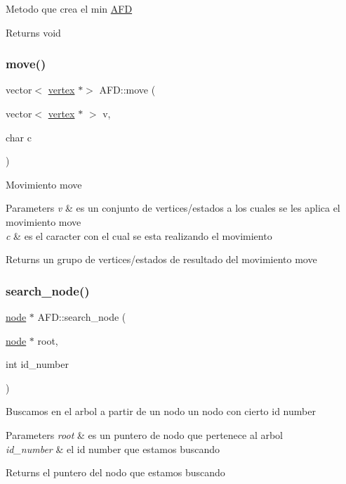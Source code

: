 Metodo que crea el min \hyperlink{class_a_f_d}{A\+FD} \begin{DoxyReturn}{Returns}
void 
\end{DoxyReturn}
\hypertarget{class_a_f_d_a4505bb76534ae8c4df01c164912f5c52}{}\label{class_a_f_d_a4505bb76534ae8c4df01c164912f5c52} 
\subsubsection{\texorpdfstring{move()}{move()}}
{\footnotesize\ttfamily vector$<$ \hyperlink{structvertex}{vertex} $\ast$$>$ A\+F\+D\+::move (\begin{DoxyParamCaption}\item[{vector$<$ \hyperlink{structvertex}{vertex} $\ast$ $>$}]{v,  }\item[{char}]{c }\end{DoxyParamCaption})}

Movimiento move 
\begin{DoxyParams}{Parameters}
{\em v} & es un conjunto de vertices/estados a los cuales se les aplica el movimiento move \\
\hline
{\em c} & es el caracter con el cual se esta realizando el movimiento \\
\hline
\end{DoxyParams}
\begin{DoxyReturn}{Returns}
un grupo de vertices/estados de resultado del movimiento move 
\end{DoxyReturn}
\hypertarget{class_a_f_d_a4dfefc5091e8654160f65db0bc4fc0b0}{}\label{class_a_f_d_a4dfefc5091e8654160f65db0bc4fc0b0} 
\subsubsection{\texorpdfstring{search\+\_\+node()}{search\_node()}}
{\footnotesize\ttfamily \hyperlink{structnode}{node} $\ast$ A\+F\+D\+::search\+\_\+node (\begin{DoxyParamCaption}\item[{\hyperlink{structnode}{node} $\ast$}]{root,  }\item[{int}]{id\+\_\+number }\end{DoxyParamCaption})}

Buscamos en el arbol a partir de un nodo un nodo con cierto id number 
\begin{DoxyParams}{Parameters}
{\em root} & es un puntero de nodo que pertenece al arbol \\
\hline
{\em id\+\_\+number} & el id number que estamos buscando \\
\hline
\end{DoxyParams}
\begin{DoxyReturn}{Returns}
el puntero del nodo que estamos buscando 
\end{DoxyReturn}
\hypertarget{class_a_f_d_a9d332b7d65be308507b10e7abf0a9d11}{}\label{class_a_f_d_a9d332b7d65be308507b10e7abf0a9d11} 
